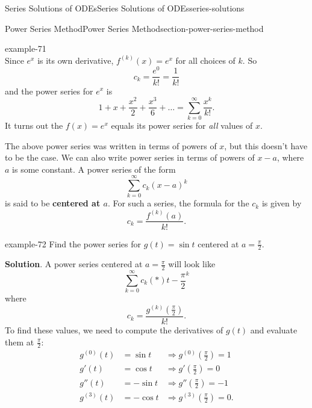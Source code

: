 \documentclass[oneside,10pt,]{book}
\newcommand{\terminology}[1]{\textbf{#1}}
\numberwithin{equation}{section}
\newcommand{\parens}[1]{\left( #1 \right)}
\newcommand{\amp}{&}
\begin{document}
\begin{chapterptx}{Series Solutions of ODEs}{}{Series Solutions of ODEs}{}{}{series-solutions}
\begin{sectionptx}{Power Series Method}{}{Power Series Method}{}{}{section-power-series-method}
\begin{example}{}{example-71}
\begin{equation*}
\end{equation*}
Since \(e^{x}\) is its own derivative, \(f^{(k)}(x) = e^{x}\) for all choices of \(k\). So%
\begin{equation*}
c_{k} = \frac{e^{0}}{k!} = \frac{1}{k!}
\end{equation*}
and the power series for \(e^{x}\) is%
\begin{equation*}
1+x+\frac{x^{2}}{2}+\frac{x^{3}}{6} + \dots = \sum_{k=0}^{\infty}\frac{x^{k}}{k!}.
\end{equation*}
It turns out the \(f(x) = e^{x}\) equals its power series for \emph{all} values of \(x\).%
\end{example}
\hypertarget{p-432}{}%
The above power series was written in terms of powers of \(x\), but this doesn't have to be the case. We can also write power series in terms of powers of \(x-a\), where \(a\) is some constant. A power series of the form%
\begin{equation*}
\sum_{k=0}^{\infty}c_{k}(x-a)^{k}
\end{equation*}
is said to be \terminology{centered at \(a\)}. For such a series, the formula for the \(c_{k}\) is given by%
\begin{equation*}
c_{k} = \frac{f^{(k)}(a)}{k!}.
\end{equation*}
%
\begin{example}{}{example-72}%
\hypertarget{p-433}{}%
Find the power series for \(g(t) = \sin t\) centered at \(a = \frac{\pi}{2}\).%
\par\smallskip%
\noindent\textbf{Solution}.\hypertarget{solution-69}{}\quad%
\hypertarget{p-434}{}%
A power series centered at \(a = \frac{\pi}{2}\) will look like%
\begin{equation*}
\sum_{k=0}^{\infty}c_{k}\parens*{t-\frac{\pi}{2}}^{k}
\end{equation*}
where%
\begin{equation*}
c_{k} = \frac{g^{(k)}(\frac{\pi}{2})}{k!}.
\end{equation*}
To find these values, we need to compute the derivatives of \(g(t)\) and evaluate them at \(\frac{\pi}{2}\):%
\begin{align*}
g^{(0)}(t) \amp= \sin t \amp\Rightarrow g^{(0)}(\frac{\pi}{2}) = 1\\
g'(t) \amp= \cos t \amp\Rightarrow g'(\frac{\pi}{2}) = 0\\
g''(t) \amp= -\sin t \amp\Rightarrow g''(\frac{\pi}{2}) = -1\\
g^{(3)}(t) \amp= -\cos t \amp\Rightarrow g^{(3)}(\frac{\pi}{2}) = 0\text{.}
\end{align*}

\end{example}
\end{sectionptx}
\end{chapterptx}
\end{document}
